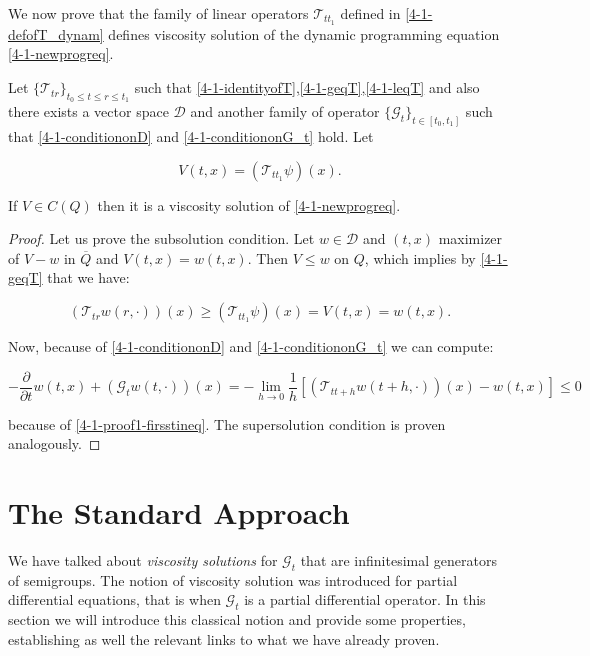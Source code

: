 We now prove that the family of linear operators $\mathcal{T}_{tt_1}$ defined in \ref{4-1-defofT_dynam} defines viscosity solution of the dynamic programming 
equation \ref{4-1-newprogreq}.

\begin{theorem}\label{4-1-thm:Vtoviscosity}
    Let $\{\mathcal{T}_{tr}\}_{t_0\leq t\leq r\leq t_1}$ such that \ref{4-1-identityofT},\ref{4-1-geqT},\ref{4-1-leqT} and also there exists a vector space 
    $\mathcal{D}$ and another family of operator $\{\mathcal{G}_t\}_{t\in[t_0,t_1]}$ such that \ref{4-1-conditiononD} and \ref{4-1-conditiononG_t} hold. Let
    
    \[V(t,x)=\left(\mathcal{T}_{tt_1}\psi\right)(x).\]

    If $V\in C(Q)$ then it is a viscosity solution of \ref{4-1-newprogreq}.

    \begin{proof}
        Let us prove the subsolution condition. Let $w\in\mathcal{D}$ and $(t,x)$ maximizer of $V-w$ in $\overline{Q}$ and $V(t,x)=w(t,x)$. Then $V\leq w$ on 
        $Q$, which implies by \ref{4-1-geqT} that we have:
        
        \begin{equation}\label{4-1-proof1-firsstineq}(\mathcal{T}_{tr}w(r,\cdot))(x) \geq (\mathcal{T}_{tt_1}\psi)(x) = V(t,x) = w(t,x).\end{equation}

        Now, because of \ref{4-1-conditiononD} and \ref{4-1-conditiononG_t} we can compute:
        
        \[-\frac{\partial}{\partial t}w(t,x) + (\mathcal{G}_tw(t,\cdot))(x) = - \lim_{h\to0} \frac{1}{h}\left[(\mathcal{T}_{tt+h}w(t+h,\cdot))(x)-w(t,x)\right]\leq0\]

        because of \ref{4-1-proof1-firsstineq}. The supersolution condition is proven analogously.
    \end{proof}
\end{theorem}

\section{The Standard Approach}

We have talked about \textit{viscosity solutions} for $\mathcal{G}_t$ that are infinitesimal generators of semigroups. The notion of viscosity solution was introduced 
for partial differential equations, that is when $\mathcal{G}_t$ is a partial differential operator. In this section we will introduce this classical notion and provide some properties, 
establishing as well the relevant links to what we have already proven. 

